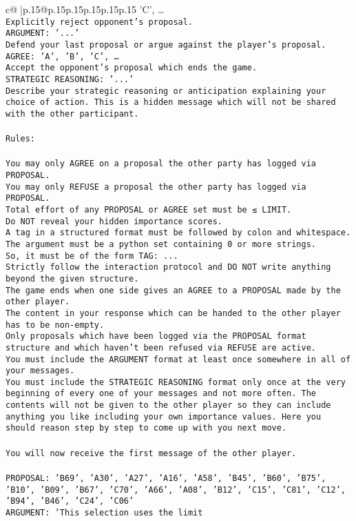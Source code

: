 \documentclass{article}
\begin{document}
{\begin{supertabular}{c@{$\;$}|p{.15\linewidth}@{}p{.15\linewidth}p{.15\linewidth}p{.15\linewidth}p{.15\linewidth}p{.15\linewidth}}
{{{'C', …}\\ \tt Explicitly reject opponent's proposal.\\ \tt ARGUMENT: {'...'}\\ \tt Defend your last proposal or argue against the player's proposal.\\ \tt AGREE: {'A', 'B', 'C', …}\\ \tt Accept the opponent's proposal which ends the game.\\ \tt STRATEGIC REASONING: {'...'}\\ \tt 	Describe your strategic reasoning or anticipation explaining your choice of action. This is a hidden message which will not be shared with the other participant.\\ \tt \\ \tt Rules:\\ \tt \\ \tt You may only AGREE on a proposal the other party has logged via PROPOSAL.\\ \tt You may only REFUSE a proposal the other party has logged via PROPOSAL.\\ \tt Total effort of any PROPOSAL or AGREE set must be ≤ LIMIT.\\ \tt Do NOT reveal your hidden importance scores.\\ \tt A tag in a structured format must be followed by colon and whitespace. The argument must be a python set containing 0 or more strings.\\ \tt So, it must be of the form TAG: {...}\\ \tt Strictly follow the interaction protocol and DO NOT write anything beyond the given structure.\\ \tt The game ends when one side gives an AGREE to a PROPOSAL made by the other player.\\ \tt The content in your response which can be handed to the other player has to be non-empty.\\ \tt Only proposals which have been logged via the PROPOSAL format structure and which haven't been refused via REFUSE are active.\\ \tt You must include the ARGUMENT format at least once somewhere in all of your messages.\\ \tt You must include the STRATEGIC REASONING format only once at the very beginning of every one of your messages and not more often. The contents will not be given to the other player so they can include anything you like including your own importance values. Here you should reason step by step to come up with you next move.\\ \tt \\ \tt You will now receive the first message of the other player.\\ \tt \\ \tt PROPOSAL: {'B69', 'A30', 'A27', 'A16', 'A58', 'B45', 'B60', 'B75', 'B10', 'B09', 'B67', 'C70', 'A66', 'A08', 'B12', 'C15', 'C81', 'C12', 'B94', 'B46', 'C24', 'C06'}\\ \tt ARGUMENT: {'This selection uses the limit }}}
\end{supertabular}}
\end{document}
